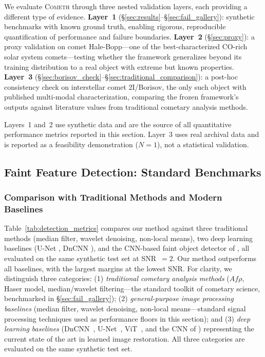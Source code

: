 \documentclass[usenatbib]{mnras}
\begin{document}
We evaluate \textsc{Cometh} through three nested validation layers, each providing a different type of evidence. \textbf{Layer~1} (\S\ref{sec:results}--\S\ref{sec:fail_gallery}): synthetic benchmarks with known ground truth, enabling rigorous, reproducible quantification of performance and failure boundaries. \textbf{Layer~2} (\S\ref{sec:proxy}): a proxy validation on comet Hale-Bopp---one of the best-characterized CO-rich solar system comets---testing whether the framework generalizes beyond its training distribution to a real object with extreme but known properties. \textbf{Layer~3} (\S\ref{sec:borisov_check}--\S\ref{sec:traditional_comparison}): a post-hoc consistency check on interstellar comet 2I/Borisov, the only such object with published multi-modal characterization, comparing the frozen framework's outputs against literature values from traditional cometary analysis methods.

Layers~1 and~2 use synthetic data and are the source of all quantitative performance metrics reported in this section. Layer~3 uses real archival data and is reported as a feasibility demonstration ($N=1$), not a statistical validation.

\subsection{Faint Feature Detection: Standard Benchmarks}

\subsubsection{Comparison with Traditional Methods and Modern Baselines}

Table~\ref{tab:detection_metrics} compares our method against three traditional methods (median filter, wavelet denoising, non-local means), two deep learning baselines (U-Net \citealt{ronneberger15}, DnCNN \citealt{zhang17}), and the CNN-based faint object detector of \citet{jiang23}, all evaluated on the same synthetic test set at SNR~$=2$. Our method outperforms all baselines, with the largest margins at the lowest SNR. For clarity, we distinguish three categories: (1) \textit{traditional cometary analysis methods} ($Af\rho$, Haser model, median/wavelet filtering---the standard toolkit of cometary science, benchmarked in \S\ref{sec:fail_gallery}); (2) \textit{general-purpose image processing baselines} (median filter, wavelet denoising, non-local means---standard signal processing techniques used as performance floors in this section); and (3) \textit{deep learning baselines} (DnCNN~\citealt{zhang17}, U-Net~\citealt{ronneberger15}, ViT~\citealt{dosovitskiy21}, and the CNN of \citet{jiang23}) representing the current state of the art in learned image restoration. All three categories are evaluated on the same synthetic test set.
\end{document}
